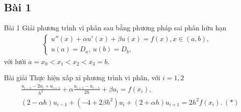\documentclass[9pt]{beamer}
\begin{document}
\subsection{Bài 1}

\begin{frame}
    \begin{block}{Bài 1}
    Giải phương trình vi phân sau bằng phương pháp sai phân hữu hạn
    \begin{align*}
        \begin{cases}
            u''(x) + \alpha u'(x) + \beta u(x) = f(x), x \in (a,b), \\
            u(a) = D_a, \  u(b) = D_b,
        \end{cases}
    \end{align*}
    với lưới $a = x_0 < x_1 < x_2 < x_3 = b$.
    \end{block}
    \begin{exampleblock}{Bài giải}
    Thực hiện xấp xỉ phương trình vi phân, với $i = \overline{1,2}$
    \begin{align*}
        & \frac{u_{i-1} - 2u_i + u_{i+1}}{h^2} + \alpha \frac{u_{i+1} - u_{i-1}}{2h} + \beta u_i = f(x_i), \\
        & (2 - \alpha h) u_{i-1} + (-4 + 2\beta h^2) u_i + (2 + \alpha h) u_{i+1} = 2h^2 f(x_i). \ (*)
    \end{align*}
    \end{exampleblock}
\end{frame}
\end{document}
